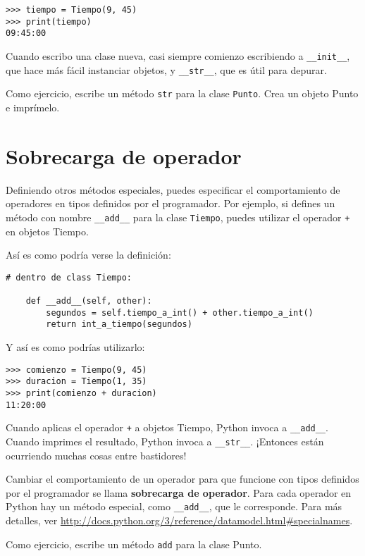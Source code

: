 \documentclass[10pt]{book}
\begin{document}
\begin{verbatim}
>>> tiempo = Tiempo(9, 45)
>>> print(tiempo)
09:45:00
\end{verbatim}
%
Cuando escribo una clase nueva, casi siempre comienzo escribiendo a
\verb"__init__", que hace más fácil instanciar objetos, y
\verb"__str__", que es útil para depurar.

Como ejercicio, escribe un método {\tt str} para la clase {\tt Punto}.
Crea un objeto Punto e imprímelo.


\section{Sobrecarga de operador}
\label{operator.overloading}

Definiendo otros métodos especiales, puedes especificar el comportamiento
de operadores en tipos definidos por el programador.  Por ejemplo, si defines
un método con nombre \verb"__add__" para la clase {\tt Tiempo}, puedes utilizar el
operador {\tt +} en objetos Tiempo.

Así es como podría verse la definición:

\begin{verbatim}
# dentro de class Tiempo:

    def __add__(self, other):
        segundos = self.tiempo_a_int() + other.tiempo_a_int()
        return int_a_tiempo(segundos)
\end{verbatim}
%
Y así es como podrías utilizarlo:

\begin{verbatim}
>>> comienzo = Tiempo(9, 45)
>>> duracion = Tiempo(1, 35)
>>> print(comienzo + duracion)
11:20:00
\end{verbatim}
%
Cuando aplicas el operador {\tt +} a objetos Tiempo, Python invoca a
\verb"__add__".  Cuando imprimes el resultado, Python invoca a
\verb"__str__".  ¡Entonces están ocurriendo muchas cosas entre bastidores!

Cambiar el comportamiento de un operador para que funcione con
tipos definidos por el programador se llama {\bf sobrecarga de operador}.  Para cada
operador en Python hay un método especial, como
\verb"__add__", que le corresponde.  Para más detalles, ver
\url{http://docs.python.org/3/reference/datamodel.html#specialnames}.

Como ejercicio, escribe un método {\tt add} para la clase Punto.
\end{document}
